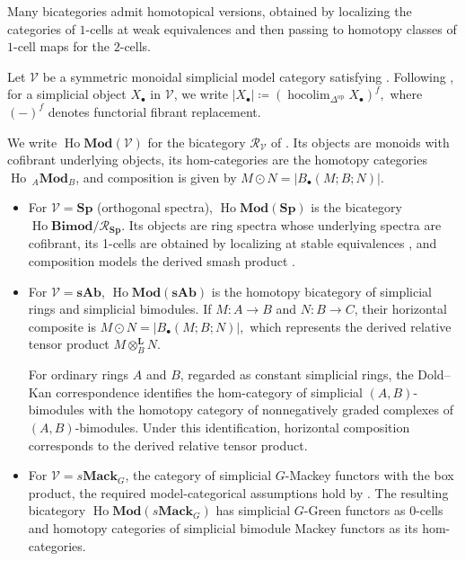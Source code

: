 \documentclass[11pt,oneside]{amsart}
\DeclareMathOperator{\Ho}{Ho}
\numberwithin{equation}{section}
\numberwithin{figure}{section}
\theoremstyle{plain}
\theoremstyle{definition}
\theoremstyle{remark}
\begin{document}
 \begin{remark}\label{rem:HoModV}
Many bicategories admit homotopical versions, obtained by localizing the categories of $1$-cells at weak equivalences and then passing to homotopy classes of $1$-cell maps for the $2$-cells. 

Let $\mathcal V$ be a symmetric monoidal simplicial model category satisfying \cite[Assumption~3.1.1]{AGHKK}. Following \cite[Notation~3.1.3]{AGHKK}, for a simplicial object $X_\bullet$ in $\mathcal V$, we write
\(
|X_\bullet| \coloneqq \left( \operatorname{hocolim}_{\Delta^{\mathrm{op}}}X_\bullet \right)^f,
\)
where $(-)^f$ denotes functorial fibrant replacement.

We write $\Ho\mathbf{Mod}(\mathcal V)$ for the bicategory $\mathcal R_{\mathcal V}$ of \cite[Definition~3.1.2]{AGHKK}. 
Its objects are monoids with cofibrant underlying objects, its hom-categories are the homotopy categories $\Ho\,{}_A\mathbf{Mod}_B$, and composition is given by  $M\odot N = \vert{}B_\bullet(M;B;N)\vert{}$.
\begin{itemize}
    \item For $\mathcal V=\mathbf{Sp}$ (orthogonal spectra), $\Ho\mathbf{Mod}(\mathbf{Sp})$ is the bicategory $\Ho\mathbf{Bimod}/\mathcal{R}_{\mathbf{Sp}}$. Its objects are ring spectra whose underlying spectra are cofibrant, its 1-cells are obtained by localizing at stable equivalences \cite{MMSS}, and composition models the derived smash product \cite{EKMM97}.

    \item For \(\mathcal V=\mathbf{sAb}\),
\(\Ho\mathbf{Mod}(\mathbf{sAb})\) is the homotopy bicategory of
simplicial rings and simplicial bimodules. If
\(M\colon A\to B\) and \(N\colon B\to C\), their horizontal composite is
\(
M\odot N
=
\left|B_\bullet(M;B;N)\right|,
\)
which represents the derived relative tensor product
\(M\otimes_B^{\mathbf L}N\).

For ordinary rings \(A\) and \(B\), regarded as constant simplicial
rings, the Dold--Kan correspondence identifies the hom-category of
simplicial \((A,B)\)-bimodules with the homotopy category of
nonnegatively graded complexes of \((A,B)\)-bimodules. Under this
identification, horizontal composition corresponds to the derived
relative tensor product.

    \item For \(\mathcal V=s\mathbf{Mack}_G\), the category of
    simplicial \(G\)-Mackey functors with the box product, the required
    model-categorical assumptions hold by
    \cite[Theorem~4.3 and Proposition~4.4]{BGHL}. The resulting
    bicategory
    \(
    \Ho\mathbf{Mod}(s\mathbf{Mack}_G)
    \)
    has simplicial \(G\)-Green functors as \(0\)-cells and homotopy
    categories of simplicial bimodule Mackey functors as its
    hom-categories.
\end{itemize}
\end{remark}
\end{document}

